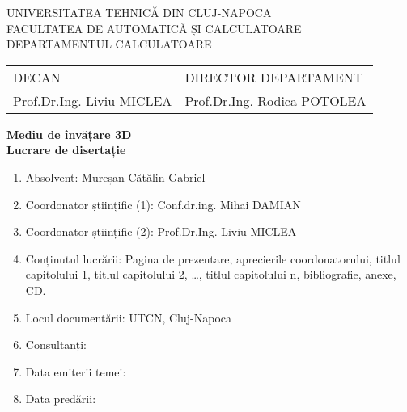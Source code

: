 \documentclass[12pt,a4paper,twoside]{report}
\begin{document}
\begin{titlepage}

\begin{center}
UNIVERSITATEA TEHNICĂ DIN CLUJ-NAPOCA\\
FACULTATEA DE AUTOMATICĂ ȘI CALCULATOARE\\
DEPARTAMENTUL CALCULATOARE\\

\vspace{1cm}

%
\begin{tabularx}{\textwidth}{lR}
DECAN & DIRECTOR DEPARTAMENT \\
Prof.Dr.Ing. Liviu MICLEA & Prof.Dr.Ing. Rodica POTOLEA\\
\end{tabularx}

\vspace {3cm}

\Huge \textbf{Mediu de învățare 3D}\\
\vspace {1cm}
\Large \textbf{Lucrare de disertație}\\
\vspace{1cm}

\end{center}


\begin{flushleft}
\begin{enumerate}
 \item Absolvent: Mureșan Cătălin-Gabriel

 \item Coordonator științific (1): Conf.dr.ing. Mihai DAMIAN\\
 \item Coordonator științific (2): Prof.Dr.Ing. Liviu MICLEA
 \item Conținutul lucrării: Pagina de prezentare, aprecierile coordonatorului, titlul capitolului 1, titlul capitolului 2, \dots, titlul capitolului n, bibliografie, anexe, CD.

 \item Locul documentării: UTCN, Cluj-Napoca

 \item Consultanți: \dotfill

 \item Data emiterii temei: \dotfill

 \item Data predării: \dotfill
\end{enumerate}


\end{flushleft}
\end{titlepage}
\end{document}
